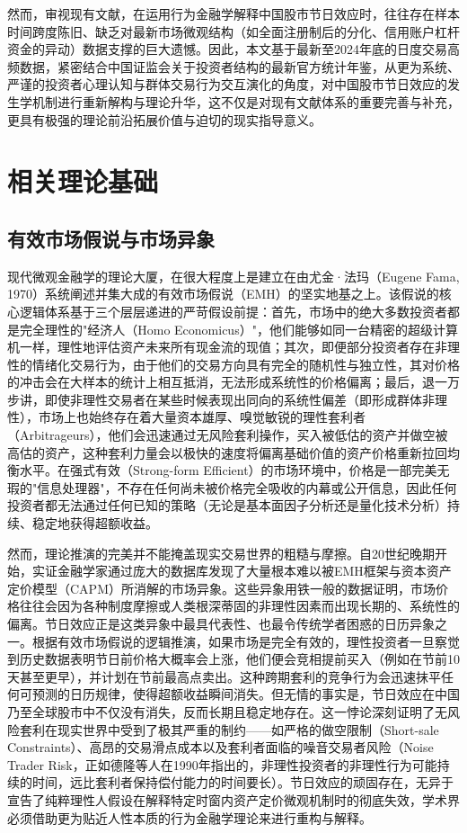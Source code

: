 \documentclass{cupb-thesis}
\begin{document}
然而，审视现有文献，在运用行为金融学解释中国股市节日效应时，往往存在样本时间跨度陈旧、缺乏对最新市场微观结构（如全面注册制后的分化、信用账户杠杆资金的异动）数据支撑的巨大遗憾。因此，本文基于最新至2024年底的日度交易高频数据，紧密结合中国证监会关于投资者结构的最新官方统计年鉴，从更为系统、严谨的投资者心理认知与群体交易行为交互演化的角度，对中国股市节日效应的发生学机制进行重新解构与理论升华，这不仅是对现有文献体系的重要完善与补充，更具有极强的理论前沿拓展价值与迫切的现实指导意义。


\chapter*{相关理论基础}


\section{有效市场假说与市场异象}


现代微观金融学的理论大厦，在很大程度上是建立在由尤金·法玛（Eugene Fama, 1970）系统阐述并集大成的有效市场假说（EMH）的坚实地基之上。该假说的核心逻辑体系基于三个层层递进的严苛假设前提：首先，市场中的绝大多数投资者都是完全理性的"经济人（Homo Economicus）"，他们能够如同一台精密的超级计算机一样，理性地评估资产未来所有现金流的现值；其次，即便部分投资者存在非理性的情绪化交易行为，由于他们的交易方向具有完全的随机性与独立性，其对价格的冲击会在大样本的统计上相互抵消，无法形成系统性的价格偏离；最后，退一万步讲，即使非理性交易者在某些时候表现出同向的系统性偏差（即形成群体非理性），市场上也始终存在着大量资本雄厚、嗅觉敏锐的理性套利者（Arbitrageurs），他们会迅速通过无风险套利操作，买入被低估的资产并做空被高估的资产，这种套利力量会以极快的速度将偏离基础价值的资产价格重新拉回均衡水平。在强式有效（Strong-form Efficient）的市场环境中，价格是一部完美无瑕的"信息处理器"，不存在任何尚未被价格完全吸收的内幕或公开信息，因此任何投资者都无法通过任何已知的策略（无论是基本面因子分析还是量化技术分析）持续、稳定地获得超额收益。


然而，理论推演的完美并不能掩盖现实交易世界的粗糙与摩擦。自20世纪晚期开始，实证金融学家通过庞大的数据库发现了大量根本难以被EMH框架与资本资产定价模型（CAPM）所消解的市场异象。这些异象用铁一般的数据证明，市场价格往往会因为各种制度摩擦或人类根深蒂固的非理性因素而出现长期的、系统性的偏离。节日效应正是这类异象中最具代表性、也最令传统学者困惑的日历异象之一。根据有效市场假说的逻辑推演，如果市场是完全有效的，理性投资者一旦察觉到历史数据表明节日前价格大概率会上涨，他们便会竞相提前买入（例如在节前10天甚至更早），并计划在节前最高点卖出。这种跨期套利的竞争行为会迅速抹平任何可预测的日历规律，使得超额收益瞬间消失。但无情的事实是，节日效应在中国乃至全球股市中不仅没有消失，反而长期且稳定地存在。这一悖论深刻证明了无风险套利在现实世界中受到了极其严重的制约——如严格的做空限制（Short-sale Constraints）、高昂的交易滑点成本以及套利者面临的噪音交易者风险（Noise Trader Risk，正如德隆等人在1990年指出的，非理性投资者的非理性行为可能持续的时间，远比套利者保持偿付能力的时间要长）。节日效应的顽固存在，无异于宣告了纯粹理性人假设在解释特定时窗内资产定价微观机制时的彻底失效，学术界必须借助更为贴近人性本质的行为金融学理论来进行重构与解释。
\end{document}
